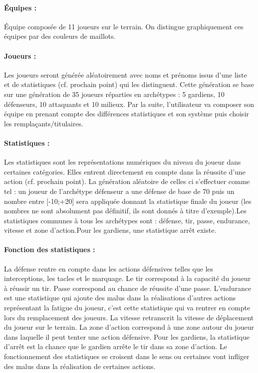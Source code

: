 \paragraph{Équipes :} Équipe composée de 11 joueurs sur le terrain. On distingue graphiquement ces équipes par des couleurs de maillots.

\paragraph{Joueurs :} Les joueurs seront générée aléatoirement avec noms et prénoms issus d’une liste et de statistiques (cf. prochain point) qui les distinguent. Cette génération se base sur une génération de 35 joueurs réparties en archétypes : 5 gardiens, 10 défenseurs, 10 attaquants et 10 milieux. Par la suite, l’utilisateur va composer son équipe en prenant compte des différences statistiques et son système puis choisir les remplaçants/titulaires.

\paragraph{Statistiques :} Les statistiques sont les représentations numériques du niveau du joueur dans certaines catégories. Elles entrent directement en compte dans la réussite d’une action (cf. prochain point). La génération aléatoire de celles ci s’effectuer comme tel : un joueur de l'archétype défenseur a une défense de base de 70 puis un nombre entre [-10;+20] sera appliquée donnant la statistique finale du joueur (les nombres ne sont absolument pas définitif, ils sont donnés à titre d’exemple).Les statistiques communes à tous les archétypes sont : défense, tir, passe, endurance, vitesse et zone d’action.Pour les gardiens, une statistique arrêt existe.

\paragraph{Fonction des statistiques :} La défense rentre en compte dans les actions défensives telles que les interceptions, les tacles et le marquage. Le tir correspond à la capacité du joueur à réussir un tir. Passe correspond au chance de réussite d’une passe. L’endurance est une statistique qui ajoute des malus dans la réalisations d’autres actions représentant la fatigue du joueur, c’est cette statistique qui va rentrer en compte lors du remplacement des joueurs. La vitesse retranscrit la vitesse de déplacement du joueur sur le terrain. La zone d’action correspond à une zone autour du joueur dans laquelle il peut tenter une action défensive. Pour les gardiens, la statistique d’arrêt est la chance que le gardien arrête le tir dans sa zone d’action. Le fonctionnement des statistiques se croisent dans le sens ou certaines vont infliger des malus dans la réalisation de certaines actions.

